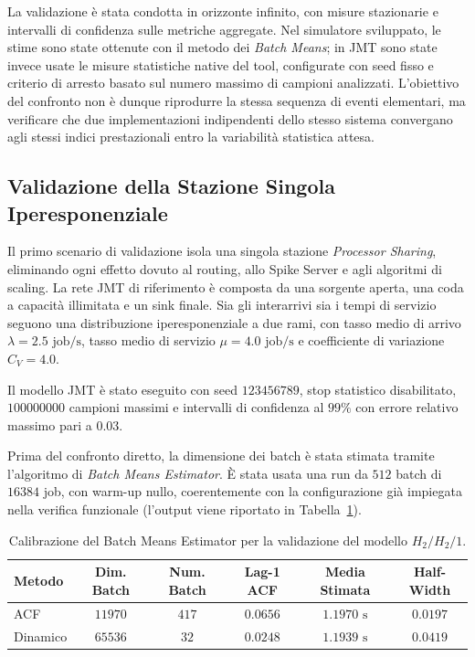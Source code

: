 ﻿\documentclass[a4paper,12pt]{article}
\begin{document}
La validazione è stata condotta in orizzonte infinito, con misure stazionarie e intervalli di confidenza sulle metriche aggregate. Nel simulatore sviluppato, le stime sono state ottenute con il metodo dei \textit{Batch Means}; in JMT sono state invece usate le misure statistiche native del tool, configurate con seed fisso e criterio di arresto basato sul numero massimo di campioni analizzati. L'obiettivo del confronto non è dunque riprodurre la stessa sequenza di eventi elementari, ma verificare che due implementazioni indipendenti dello stesso sistema convergano agli stessi indici prestazionali entro la variabilità statistica attesa.


\subsection{Validazione della Stazione Singola Iperesponenziale}
Il primo scenario di validazione isola una singola stazione \textit{Processor Sharing}, eliminando ogni effetto dovuto al routing, allo Spike Server e agli algoritmi di scaling. La rete JMT di riferimento è composta da una sorgente aperta, una coda a capacità illimitata e un sink finale. Sia gli interarrivi sia i tempi di servizio seguono una distribuzione iperesponenziale a due rami, con tasso medio di arrivo $\lambda = 2.5\text{ job/s}$, tasso medio di servizio $\mu = 4.0\text{ job/s}$ e coefficiente di variazione $C_V = 4.0$.

Il modello JMT è stato eseguito con seed $123456789$, stop statistico disabilitato, $100000000$ campioni massimi e intervalli di confidenza al $99\%$ con errore relativo massimo pari a $0.03$.

Prima del confronto diretto, la dimensione dei batch è stata stimata tramite l'algoritmo di \textit{Batch Means Estimator}. È stata usata una run da $512$ batch di $16384$ job, con warm-up nullo, coerentemente con la configurazione già impiegata nella verifica funzionale (l'output viene riportato in Tabella~\ref{tab:validation_hyperexp_batch}).

\begin{table}[htbp]
    \centering
    \small
    \renewcommand{\arraystretch}{1.3}
    \begin{tabular}{lccccc}
        \hline
        \textbf{Metodo} & \textbf{Dim. Batch} & \textbf{Num. Batch} & \textbf{Lag-1 ACF} & \textbf{Media Stimata} & \textbf{Half-Width} \\ \hline
        ACF             & $11970$             & $417$               & $0.0656$           & $1.1970\text{ s}$      & $0.0197$            \\
        Dinamico        & $65536$             & $32$                & $0.0248$           & $1.1939\text{ s}$      & $0.0419$            \\ \hline
    \end{tabular}
    \caption{Calibrazione del Batch Means Estimator per la validazione del modello $H_2/H_2/1$.}
    \label{tab:validation_hyperexp_batch}
\end{table}
\end{document}
